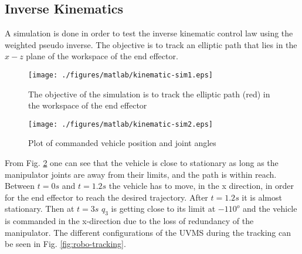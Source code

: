 \subsection{Inverse Kinematics}

A simulation is done in order to test the inverse kinematic control law using the weighted pseudo inverse. The objective is to track an elliptic path that lies in the $x-z$ plane of the workspace of the end effector. 

\begin{figure}[h!]
	\centering
	\texttt{[image: ./figures/matlab/kinematic-sim1.eps]}
	
	\caption{The objective of the simulation is to track the elliptic path (red) in the workspace of the end effector }
	\label{fig:robot-sim1}
\end{figure}


\begin{figure}[h!]
	\centering
	\texttt{[image: ./figures/matlab/kinematic-sim2.eps]}
	
	\caption{Plot of commanded vehicle position and joint angles }
	\label{fig:robot-sim2}
\end{figure}

From Fig. \ref{fig:robot-sim2} one can see that the vehicle is close to stationary as long as the manipulator joints are away from their limits, and the path is within reach. Between $t=0 s$ and $t=1.2 s$ the vehicle has to move, in the x direction, in order for the end effector to reach the desired trajectory. After $t=1.2 s$ it is almost stationary. Then at $t=3 s $ $ q_{3}$ is getting close to its limit at $-110^{o}$ and the vehicle is commanded in the x-direction due to the loss of redundancy of the manipulator. The different configurations of the UVMS during the tracking can be seen in Fig. \ref{fig:robo-tracking}.  


